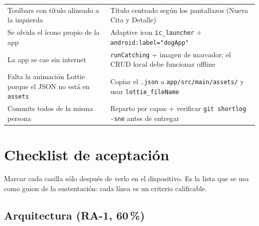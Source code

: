\documentclass[11pt,letterpaper]{article}
\newcommand{\code}[1]{\texttt{\small #1}}
\begin{document}
\begin{center}
\begin{xltabular}{\linewidth}{@{}X X@{}}
Toolbars con t\'itulo alineado a la izquierda & T\'itulo centrado seg\'un los pantallazos (Nueva Cita y Detalle)\\
Se olvida el \'icono propio de la app & Adaptive icon \code{ic\_launcher} + \code{android:\allowbreak{}label="dogApp"}\\
La app se cae sin internet & \code{runCatching} + imagen de marcador; el CRUD local debe funcionar offline\\
Falta la animaci\'on Lottie porque el JSON no est\'a en \code{assets} & Copiar el \code{.json} a \code{app/src/main/assets/\allowbreak{}} y usar \code{lottie\_fileName}\\
Commits todos de la misma persona & Reparto por capas + verificar \code{git shortlog -sne} antes de entregar\\
\end{xltabular}
\end{center}

\section{Checklist de aceptaci\'on}
\label{sec:checklist}

Marcar cada casilla s\'olo despu\'es de verlo en el dispositivo. Es la lista que
se usa como guion de la sustentaci\'on: cada l\'inea es un criterio calificable.

\newpage

\subsection{Arquitectura (RA-1, 60\,\%)}
\end{document}
